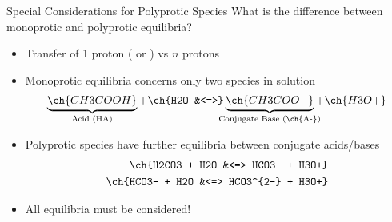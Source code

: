 \documentclass[notes=hide]{beamer}
\begin{document}

\begin{frame}{Special Considerations for Polyprotic Species}
	What is the difference between monoprotic and polyprotic equilibria?
	\begin{itemize}[<+->]
		\item Transfer of 1 proton ( or ) vs $n$ protons
		\item Monoprotic equilibria concerns only \alert{two} species in
			solution
			\begin{align*}
				\underbrace{\ch{CH3COOH}}_{\mathclap{\text{Acid
				(HA)}}} +
				\ch{H2O &<=>}
				\underbrace{\ch{CH3COO-}}_{\mathclap{\text{Conjugate
				Base (\ch{A-})}}} + \ch{H3O+}
			\end{align*}
		\item Polyprotic species have \alert{further equilibria} between
			conjugate acids/bases
			\begin{align*}
				\ch{H2CO3 + H2O &<=> HCO3- + H3O+} \\
				\ch{HCO3- + H2O &<=> HCO3^{2-} + H3O+}
			\end{align*}
		\item \alert{All} equilibria must be considered!
	\end{itemize}
\end{frame}
\end{document}
